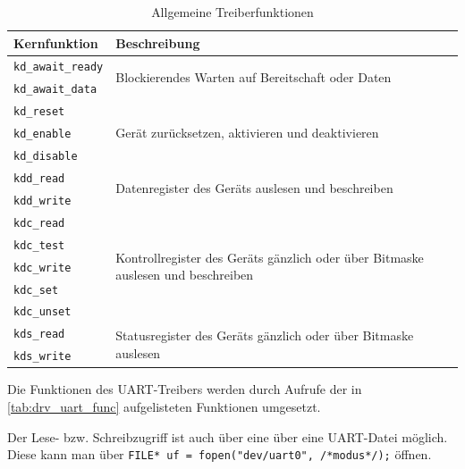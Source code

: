 \begin{table}[!htbp]
	\bigskip
	\centering
	\begin{tabular}{ l | l }
		\textbf{Kernfunktion} & \textbf{Beschreibung} \\
		\hline				
		\texttt{kd\_await\_ready} & \multirow{2}{*}{\parbox{0.5\linewidth}{Blockierendes Warten auf Bereitschaft oder Daten}} \\
		\texttt{kd\_await\_data}  \\
		\hline
		\texttt{kd\_reset} & \multirow{3}{*}{\parbox{0.5\linewidth}{Gerät zurücksetzen, aktivieren und deaktivieren}} \\
		\texttt{kd\_enable}  \\
		\texttt{kd\_disable} \\
		\hline
		\texttt{kdd\_read} & \multirow{2}{*}{\parbox{0.5\linewidth}{Datenregister des Geräts auslesen und beschreiben}} \\
		\texttt{kdd\_write} \\
		\hline
		\texttt{kdc\_read} & \multirow{5}{*}{\parbox{0.5\linewidth}{Kontrollregister des Geräts gänzlich oder über Bitmaske auslesen und beschreiben}} \\
		\texttt{kdc\_test} \\
		\texttt{kdc\_write} \\
		\texttt{kdc\_set} \\
		\texttt{kdc\_unset} \\
		\hline
		\texttt{kds\_read} & \multirow{2}{*}{\parbox{0.5\linewidth}{Statusregister des Geräts gänzlich oder über Bitmaske auslesen}} \\
		\texttt{kds\_write} \\
		\hline
	\end{tabular}
	
	\caption{Allgemeine Treiberfunktionen}
	\label{tab:drv_generic_func}
\end{table}

Die Funktionen des \gls{UART}-Treibers werden durch Aufrufe der in \cref{tab:drv_uart_func} aufgelisteten Funktionen umgesetzt.

Der Lese- bzw. Schreibzugriff ist auch über eine über eine \gls{UART}-Datei möglich. Diese kann man über \texttt{FILE* uf = fopen("dev/uart0", /*modus*/);} öffnen.

